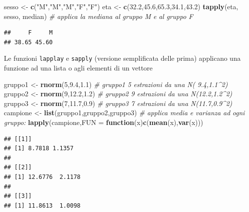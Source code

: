 \documentclass[
  11pt,
]{book}
\newenvironment{Shaded}{\begin{snugshade}}{\end{snugshade}}
\newcommand{\AttributeTok}[1]{\textcolor[rgb]{0.13,0.29,0.53}{#1}}
\newcommand{\CommentTok}[1]{\textcolor[rgb]{0.56,0.35,0.01}{\textit{#1}}}
\newcommand{\ControlFlowTok}[1]{\textcolor[rgb]{0.13,0.29,0.53}{\textbf{#1}}}
\newcommand{\DecValTok}[1]{\textcolor[rgb]{0.00,0.00,0.81}{#1}}
\newcommand{\FloatTok}[1]{\textcolor[rgb]{0.00,0.00,0.81}{#1}}
\newcommand{\FunctionTok}[1]{\textcolor[rgb]{0.13,0.29,0.53}{\textbf{#1}}}
\newcommand{\NormalTok}[1]{#1}
\newcommand{\OtherTok}[1]{\textcolor[rgb]{0.56,0.35,0.01}{#1}}
\newcommand{\StringTok}[1]{\textcolor[rgb]{0.31,0.60,0.02}{#1}}
\theoremstyle{mytheoremstyle}
\theoremstyle{mydefstyle}
\begin{document}
\begin{Shaded}
\begin{Highlighting}[]
\NormalTok{sesso }\OtherTok{\textless{}{-}} \FunctionTok{c}\NormalTok{(}\StringTok{"M"}\NormalTok{,}\StringTok{"M"}\NormalTok{,}\StringTok{"M"}\NormalTok{,}\StringTok{"F"}\NormalTok{,}\StringTok{"F"}\NormalTok{)}
\NormalTok{eta   }\OtherTok{\textless{}{-}} \FunctionTok{c}\NormalTok{(}\FloatTok{32.2}\NormalTok{,}\FloatTok{45.6}\NormalTok{,}\FloatTok{65.3}\NormalTok{,}\FloatTok{34.1}\NormalTok{,}\FloatTok{43.2}\NormalTok{)}
\FunctionTok{tapply}\NormalTok{(eta, sesso, median) }\CommentTok{\# applica la mediana al gruppo M e al gruppo F}
\end{Highlighting}
\end{Shaded}

\begin{verbatim}
##     F     M 
## 38.65 45.60
\end{verbatim}

Le funzioni \texttt{lapplay} e \texttt{sapply} (versione semplificata delle prima) applicano una funzione
ad una lista o agli elementi di un vettore

\begin{Shaded}
\begin{Highlighting}[]
\NormalTok{gruppo1 }\OtherTok{\textless{}{-}} \FunctionTok{rnorm}\NormalTok{(}\DecValTok{5}\NormalTok{,}\FloatTok{9.4}\NormalTok{,}\FloatTok{1.1}\NormalTok{)  }\CommentTok{\# gruppo1 5 estrazioni da una N( 9.4,1.1\^{}2)}
\NormalTok{gruppo2 }\OtherTok{\textless{}{-}} \FunctionTok{rnorm}\NormalTok{(}\DecValTok{9}\NormalTok{,}\FloatTok{12.2}\NormalTok{,}\FloatTok{1.2}\NormalTok{) }\CommentTok{\# gruppo2 9 estrazioni da una N(12.2,1.2\^{}2)}
\NormalTok{gruppo3 }\OtherTok{\textless{}{-}} \FunctionTok{rnorm}\NormalTok{(}\DecValTok{7}\NormalTok{,}\FloatTok{11.7}\NormalTok{,}\FloatTok{0.9}\NormalTok{) }\CommentTok{\# gruppo3 7 estrazioni da una N(11.7,0.9\^{}2)}
\NormalTok{campione }\OtherTok{\textless{}{-}} \FunctionTok{list}\NormalTok{(gruppo1,gruppo2,gruppo3)}
\CommentTok{\# applica media e varianza ad ogni gruppo:}
\FunctionTok{lapply}\NormalTok{(campione,}\AttributeTok{FUN =} \ControlFlowTok{function}\NormalTok{(x)}\FunctionTok{c}\NormalTok{(}\FunctionTok{mean}\NormalTok{(x),}\FunctionTok{var}\NormalTok{(x))) }
\end{Highlighting}
\end{Shaded}

\begin{verbatim}
## [[1]]
## [1] 8.7818 1.1357
## 
## [[2]]
## [1] 12.6776  2.1178
## 
## [[3]]
## [1] 11.8613  1.0098
\end{verbatim}
\end{document}
